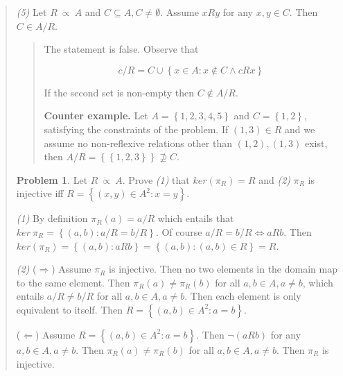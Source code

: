 \documentclass[a4paper, 12pt]{article}
\theoremstyle{definition}
\newtheorem{problem}{Problem}
\theoremstyle{definition}
\theoremstyle{definition}
\begin{document}
\begin{quote}
\textit{(5)} Let $R ~ \ddot{\propto} ~A$ and $C \subseteq A, C \neq \emptyset$.
Assume $xRy$ for any $x, y \in C$. Then $C \in A /R$.

\begin{quote}
    The statement is false. Observe that 

    $$c / R = C \cup \left\{ x \in A : x
    \not\in C \land  cRx \right\} $$

    If the second set is non-empty then $C \not\in A / R$.

    \textbf{Counter example.} Let $A = \left\{ 1, 2,3, 4, 5 \right\} $ and $C = \left\{
    1, 2 \right\} $, satisfying the constraints of the problem. If $(1, 3) \in
    R$ and we assume no non-reflexive relations other than $(1, 2), (1, 3)$ exist, then $A
    / R = \left\{ \left\{ 1, 2, 3 \right\}  \right\} \not\supseteq C$.


\end{quote}

\begin{problem}
    Let $R ~ \ddot{\propto} ~A$. Prove \textit{(1)} that $ker(\pi_R) = R$ and
    \textit{(2)} $\pi_R$ is injective iff $R = \left\{ (x, y) \in A^2 : x = y
    \right\} $.
\end{problem}

\textit{(1)} By definition $\pi_R(a) = a / R$ which entails that $ker ~ \pi_R =
\left\{ (a, b) : a/R = b / R \right\} $. Of course $a / R = b / R
\iff aRb$. Then $ker (\pi_R) = \left\{ (a, b) : aRb \right\} = \left\{ (a, b) :
(a, b) \in R\right\}  = R $.

\textit{(2)} ($\Rightarrow$) Assume $\pi_R$ is injective. Then no two elements in the domain map
to the same element. Then $\pi_R(a) \neq \pi_R(b)$ for all $a, b \in A, a \neq b$, which
entails $a / R \neq b / R$ for all $a, b \in  A, a \neq b$. Then each element is
only equivalent to itself. Then $R = \left\{ (a, b) \in A^2 : a = b \right\} $.

($\Leftarrow$) Assume $R = \left\{ (a, b) \in A^2 : a = b \right\} $. Then
$\neg(aRb)$ for any $a, b \in A, a \neq b$. Then $\pi_R(a) \neq \pi_R(b)$ for
all $a, b \in A, a \neq b$. Then $\pi_R$ is injective.

\end{quote}
\normalsize
\end{document}
